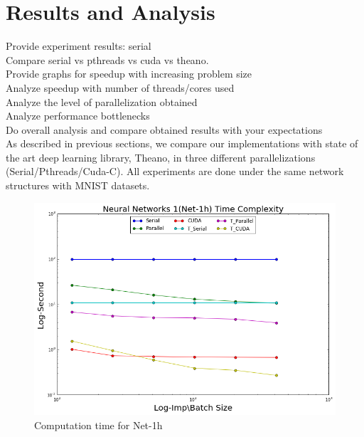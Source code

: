 \section{Results and Analysis}
\label{Results}

Provide experiment results: serial \\
Compare serial vs pthreads vs cuda vs theano. \\
Provide graphs for speedup with increasing problem size \\
Analyze speedup with number of threads/cores used \\
Analyze the level of parallelization obtained \\
Analyze performance bottlenecks \\
Do overall analysis and compare obtained results with your expectations\\

As described in previous sections, we compare our implementations with state of the art deep learning library, Theano, in three different parallelizations (Serial/Pthreads/Cuda-C). All experiments are done under the same network structures with MNIST datasets.

\begin{figure}[ht]
\begin{center}
\centerline{\includegraphics[width=\columnwidth]{../../slide/nn1_time.png}}
\caption{Computation time for Net-1h}
\label{fig:nn1_time}
\end{center}
\vskip -0.4in
\end{figure}

